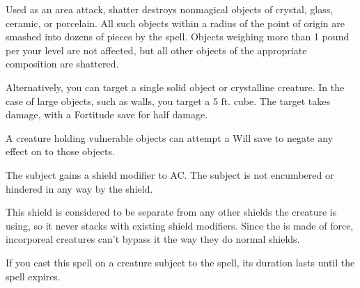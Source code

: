 \spellrng{\rngclose}
\begin{spelleffect}
  Used as an area attack, shatter destroys nonmagical objects of crystal, glass, ceramic, or porcelain. All such objects within a \areasmall radius of the point of origin are smashed into dozens of pieces by the spell. Objects weighing more than 1 pound per your level are not affected, but all other objects of the appropriate composition are shattered.
  \par Alternatively, you can target a single solid object or crystalline creature. In the case of large objects, such as walls, you target a 5 ft. cube. The target takes damage, with a Fortitude save for half damage.
  \par A creature holding vulnerable objects can attempt a Will save to negate any effect on to those objects.
\end{spelleffect}

\begin{spelleffect}
  The subject gains a  shield modifier to AC. \bonusscalingdescription The subject is not encumbered or hindered in any way by the shield.
\end{spelleffect}
\begin{spellnotes}
  This shield is considered to be separate from any other shields the creature is using, so it never stacks with existing shield modifiers. Since the  is made of force, incorporeal creatures can't bypass it the way they do normal shields.
  
  If you cast this spell on a creature subject to the  spell, its duration lasts until the  spell expires. 
\end{spellnotes}

